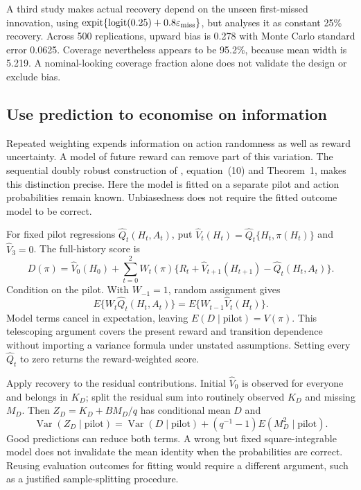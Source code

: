 A third study makes actual recovery depend on the unseen first-missed
innovation, using
$\operatorname{expit}\{\operatorname{logit}(0.25)+0.8\varepsilon_{\rm miss}\}$,
but analyses it as constant 25\% recovery. Across 500 replications, upward
bias is 0.278 with Monte Carlo standard error 0.0625. Coverage nevertheless
appears to be 95.2\%, because mean width is 5.219. A nominal-looking
coverage fraction alone does not validate the design or exclude bias.

\subsection{Use prediction to economise on information}
Repeated weighting expends information on action randomness as well as
reward uncertainty. A model of future reward can remove part of this
variation. The sequential doubly robust construction of
\citet{jiang2016}, equation~(10) and Theorem~1, makes this distinction
precise. Here the model is fitted on a separate pilot and action
probabilities remain known. Unbiasedness does not require the fitted
outcome model to be correct.

For fixed pilot regressions $\widehat Q_t(H_t,A_t)$, put
$\widehat V_t(H_t)=\widehat Q_t\{H_t,\pi(H_t)\}$ and
$\widehat V_3=0$. The full-history score is
\begin{equation}
D(\pi)=\widehat V_0(H_0)+
 \sum_{t=0}^{2}W_t(\pi)
 \{R_t+\widehat V_{t+1}(H_{t+1})-\widehat Q_t(H_t,A_t)\}.
\label{closure30:sequential-score}
\end{equation}
Condition on the pilot. With $W_{-1}=1$, random assignment gives
\[
E\{W_t\widehat Q_t(H_t,A_t)\}
  =E\{W_{t-1}\widehat V_t(H_t)\}.
\]
Model terms cancel in expectation, leaving
$E(D\mid\text{pilot})=V(\pi)$. This telescoping argument covers the present
reward and transition dependence without importing a variance formula under
unstated assumptions. Setting every $\widehat Q_t$ to zero returns the
reward-weighted score.

Apply recovery to the residual contributions. Initial $\widehat V_0$ is
observed for everyone and belongs in $K_D$; split the residual sum into
routinely observed $K_D$ and missing $M_D$. Then $Z_D=K_D+B M_D/q$ has
conditional mean $D$ and
\[
\operatorname{Var}(Z_D\mid\text{pilot})
=\operatorname{Var}(D\mid\text{pilot})
 +(q^{-1}-1)E(M_D^2\mid\text{pilot}).
\]
Good predictions can reduce both terms. A wrong but fixed square-integrable
model does not invalidate the mean identity when the probabilities are
correct. Reusing evaluation outcomes for fitting would require a different
argument, such as a justified sample-splitting procedure.

